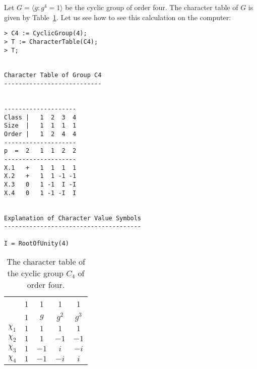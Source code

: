 \begin{example}
	Let $G=\langle g:g^4=1\rangle$ 
	be the cyclic group of order four. The character table of $G$ is given by Table~\ref{tab:C4}.  Let us see how to see this calculation on the computer:




\begin{lstlisting}
> C4 := CyclicGroup(4);
> T := CharacterTable(C4);
> T;


Character Table of Group C4
---------------------------


--------------------
Class |   1  2  3  4
Size  |   1  1  1  1
Order |   1  2  4  4
--------------------
p  =  2   1  1  2  2
--------------------
X.1   +   1  1  1  1
X.2   +   1  1 -1 -1
X.3   0   1 -1  I -I
X.4   0   1 -1 -I  I


Explanation of Character Value Symbols
--------------------------------------

I = RootOfUnity(4)    
\end{lstlisting}
    
	\begin{table}[ht]
    \caption{The character table of the cyclic group $C_4$ of order four.}
    \label{tab:C4}
		\begin{tabular}{|c|cccc|}
			\hline 
			& 1 & 1 & 1 & 1\tabularnewline
			& $1$ & $g$ & $g^2$ & $g^{3}$\tabularnewline
			\hline 
			$\chi_{1}$ & $1$ & $1$ & $1$ & $1$\tabularnewline
			$\chi_{2}$ & $1$ & $1$ & $-1$ & $-1$ \tabularnewline
			$\chi_{3}$ & $1$ & $-1$ & $i$ & $-i$\tabularnewline
			$\chi_{4}$ & $1$ & $-1$ & $-i$ & $i$\tabularnewline
			\hline
		\end{tabular}
	\end{table}


\end{example}
